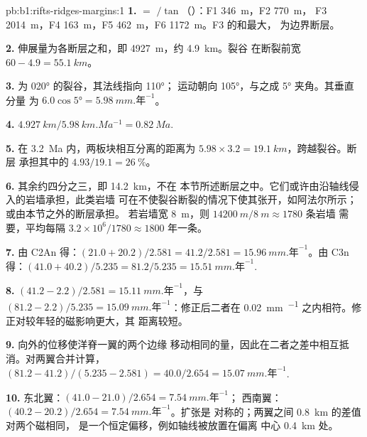\begin{solution}{pb:b1:rifts-ridges-margins:1}
\textbf{1.}  $= $ $/\tan$（）：F1 \qty{346}{m}，F2 \qty{770}{m}，
F3 \qty{2014}{m}，F4 \qty{163}{m}，F5 \qty{462}{m}，F6 \qty{1172}{m}。F3 的和最大，
为边界断层。

\textbf{2.} 伸展量为各断层之和，即 \qty{4927}{m}，约 \qty{4.9}{km}。裂谷
在断裂前宽 $60 - 4.9 = \qty{55.1}{km}$。

\textbf{3.} 为 \ang{020} 的裂谷，其法线指向 \ang{110}；
运动朝向 \ang{105}，与之成 \ang{5} 夹角。其垂直分量
为 $6.0\cos\ang{5} = \qty{5.98}{mm.\text{年}^{-1}}$。

\textbf{4.} $\qty{4.927}{km}/\qty{5.98}{km.Ma^{-1}} = \qty{0.82}{Ma}$.

\textbf{5.} 在 \qty{3.2}{Ma} 内，两板块相互分离的距离为
$5.98\times3.2 = \qty{19.1}{km}$，跨越裂谷。断层
承担其中的 $4.93/19.1 = \qty{26}{\percent}$。

\textbf{6.} 其余约四分之三，即 \qty{14.2}{km}，不在
本节所述断层之中。它们或许由沿轴线侵入的岩墙承担，此类岩墙
可在不使裂谷断裂的情况下使其张开，如阿法尔所示；或由本节之外的断层承担。
若岩墙宽 \qty{8}{m}，则 $\qty{14200}{m}/\qty{8}{m} \approx 1780$ 条岩墙
需要，平均每隔 $3.2\times10^6/1780 \approx 1800$ 年一条。

\textbf{7.} 由 C2An 得：$(21.0 + 20.2)/2.581 = 41.2/2.581 =
\qty{15.96}{mm.\text{年}^{-1}}$。由 C3n 得：$(41.0 + 40.2)/5.235 = 81.2/5.235 =
\qty{15.51}{mm.\text{年}^{-1}}$.

\textbf{8.} $(41.2 - 2.2)/2.581 = \qty{15.11}{mm.\text{年}^{-1}}$，与
$(81.2 - 2.2)/5.235 = \qty{15.09}{mm.\text{年}^{-1}}$：修正后二者在
\qty{0.02}{mm.^{-1}} 之内相符。修正对较年轻的磁影响更大，其
距离较短。

\textbf{9.} 向外的位移使洋脊一翼的两个边缘
移动相同的量，因此在二者之差中相互抵消。对两翼合并计算，
$(81.2 - 41.2)/(5.235 - 2.581) = 40.0/2.654 = \qty{15.07}{mm.\text{年}^{-1}}$.

\textbf{10.} 东北翼：$(41.0 - 21.0)/2.654 = \qty{7.54}{mm.\text{年}^{-1}}$；
西南翼：$(40.2 - 20.2)/2.654 = \qty{7.54}{mm.\text{年}^{-1}}$。扩张是
对称的；两翼之间 \qty{0.8}{km} 的差值对两个磁相同，
是一个恒定偏移，例如轴线被放置在偏离
中心 \qty{0.4}{km} 处。


\end{solution}

